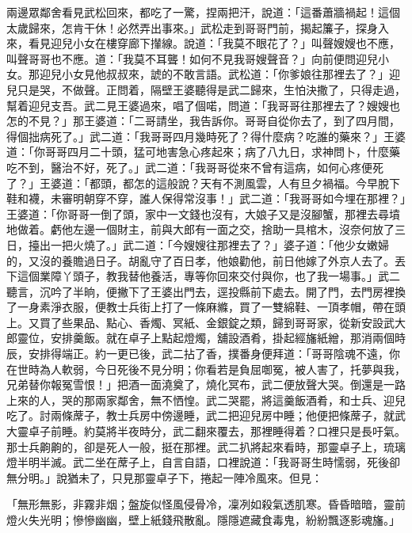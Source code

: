 \begin{showcontents}{}
兩邊眾鄰舍看見武松回來，都吃了一驚，捏兩把汗，說道：「這番蕭牆禍起！這個太歲歸來，怎肯干休！必然弄出事來。」武松走到哥哥門前，揭起簾子，探身入來，看見迎兒小女在樓穿廊下攆線。說道：「我莫不眼花了？」叫聲嫂嫂也不應，叫聲哥哥也不應。道：「我莫不耳聾！如何不見我哥嫂聲音？」向前便問迎兒小女。那迎兒小女見他叔叔來，諕的不敢言語。武松道：「你爹娘往那裡去了？」迎兒只是哭，不做聲。正問着，隔壁王婆聽得是武二歸來，生怕決撒了，只得走過，幫着迎兒支吾。武二見王婆過來，唱了個喏，問道：「我哥哥往那裡去了？嫂嫂也怎的不見？」那王婆道：「二哥請坐，我告訴你。哥哥自從你去了，到了四月間，得個拙病死了。」武二道：「我哥哥四月幾時死了？得什麼病？吃誰的藥來？」王婆道：「你哥哥四月二十頭，猛可地害急心疼起來；病了八九日，求神問卜，什麼藥吃不到，醫治不好，死了。」武二道：「我哥哥從來不曾有這病，如何心疼便死了？」王婆道：「都頭，都怎的這般說？天有不測風雲，人有旦夕禍福。今早脫下鞋和襪，未審明朝穿不穿，誰人保得常沒事！」武二道：「我哥哥如今埋在那裡？」王婆道：「你哥哥一倒了頭，家中一文錢也沒有，大娘子又是沒腳蟹，那裡去尋墳地做着。虧他左邊一個財主，前與大郎有一面之交，捨助一具棺木，沒奈何放了三日，擡出一把火燒了。」武二道：「今嫂嫂往那裡去了？」婆子道：「他少女嫩婦的，又沒的養贍過日子。胡亂守了百日孝，他娘勸他，前日他嫁了外京人去了。丟下這個業障丫頭子，教我替他養活，專等你回來交付與你，也了我一場事。」武二聽言，沉吟了半晌，便撇下了王婆出門去，逕投縣前下處去。開了門，去門房裡換了一身素淨衣服，便教士兵街上打了一條麻縧，買了一雙綿鞋、一頂孝帽，帶在頭上。又買了些果品、點心、香燭、冥紙、金銀錠之類，歸到哥哥家，從新安設武大郎靈位，安排羹飯。就在卓子上點起燈燭，舖設酒肴，掛起經旛紙繒，那消兩個時辰，安排得端正。約一更已後，武二拈了香，撲番身便拜道：「哥哥陰魂不遠，你在世時為人軟弱，今日死後不見分明；你看若是負屈啣冤，被人害了，托夢與我，兄弟替你報冤雪恨！」把酒一面澆奠了，燒化冥布，武二便放聲大哭。倒還是一路上來的人，哭的那兩家鄰舍，無不恓惶。武二哭罷，將這羹飯酒肴，和士兵、迎兒吃了。討兩條蓆子，教士兵房中傍邊睡，武二把迎兒房中睡；他便把條蓆子，就武大靈卓子前睡。約莫將半夜時分，武二翻來覆去，那裡睡得着？口裡只是長吁氣。那士兵齁齁的，卻是死人一般，挺在那裡。武二扒將起來看時，那靈卓子上，琉璃燈半明半滅。武二坐在蓆子上，自言自語，口裡說道：「我哥哥生時懦弱，死後卻無分明。」說猶未了，只見那靈卓子下，捲起一陣冷風來。但見：

「無形無影，非霧非烟；盤旋似怪風侵骨冷，凜冽如殺氣透肌寒。昏昏暗暗，靈前燈火失光明；慘慘幽幽，壁上紙錢飛散亂。隱隱遮藏食毒鬼，紛紛飄逐影魂旛。」


\end{showcontents}
